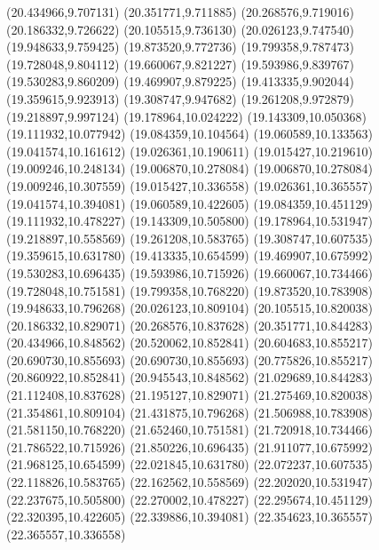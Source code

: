 {{\lineto(20.434966,9.707131)
\lineto(20.351771,9.711885)
\lineto(20.268576,9.719016)
\lineto(20.186332,9.726622)
\lineto(20.105515,9.736130)
\lineto(20.026123,9.747540)
\lineto(19.948633,9.759425)
\lineto(19.873520,9.772736)
\lineto(19.799358,9.787473)
\lineto(19.728048,9.804112)
\lineto(19.660067,9.821227)
\lineto(19.593986,9.839767)
\lineto(19.530283,9.860209)
\lineto(19.469907,9.879225)
\lineto(19.413335,9.902044)
\lineto(19.359615,9.923913)
\lineto(19.308747,9.947682)
\lineto(19.261208,9.972879)
\lineto(19.218897,9.997124)
\lineto(19.178964,10.024222)
\lineto(19.143309,10.050368)
\lineto(19.111932,10.077942)
\lineto(19.084359,10.104564)
\lineto(19.060589,10.133563)
\lineto(19.041574,10.161612)
\lineto(19.026361,10.190611)
\lineto(19.015427,10.219610)
\lineto(19.009246,10.248134)
\lineto(19.006870,10.278084)
\lineto(19.006870,10.278084)
\lineto(19.009246,10.307559)
\lineto(19.015427,10.336558)
\lineto(19.026361,10.365557)
\lineto(19.041574,10.394081)
\lineto(19.060589,10.422605)
\lineto(19.084359,10.451129)
\lineto(19.111932,10.478227)
\lineto(19.143309,10.505800)
\lineto(19.178964,10.531947)
\lineto(19.218897,10.558569)
\lineto(19.261208,10.583765)
\lineto(19.308747,10.607535)
\lineto(19.359615,10.631780)
\lineto(19.413335,10.654599)
\lineto(19.469907,10.675992)
\lineto(19.530283,10.696435)
\lineto(19.593986,10.715926)
\lineto(19.660067,10.734466)
\lineto(19.728048,10.751581)
\lineto(19.799358,10.768220)
\lineto(19.873520,10.783908)
\lineto(19.948633,10.796268)
\lineto(20.026123,10.809104)
\lineto(20.105515,10.820038)
\lineto(20.186332,10.829071)
\lineto(20.268576,10.837628)
\lineto(20.351771,10.844283)
\lineto(20.434966,10.848562)
\lineto(20.520062,10.852841)
\lineto(20.604683,10.855217)
\lineto(20.690730,10.855693)
\lineto(20.690730,10.855693)
\lineto(20.775826,10.855217)
\lineto(20.860922,10.852841)
\lineto(20.945543,10.848562)
\lineto(21.029689,10.844283)
\lineto(21.112408,10.837628)
\lineto(21.195127,10.829071)
\lineto(21.275469,10.820038)
\lineto(21.354861,10.809104)
\lineto(21.431875,10.796268)
\lineto(21.506988,10.783908)
\lineto(21.581150,10.768220)
\lineto(21.652460,10.751581)
\lineto(21.720918,10.734466)
\lineto(21.786522,10.715926)
\lineto(21.850226,10.696435)
\lineto(21.911077,10.675992)
\lineto(21.968125,10.654599)
\lineto(22.021845,10.631780)
\lineto(22.072237,10.607535)
\lineto(22.118826,10.583765)
\lineto(22.162562,10.558569)
\lineto(22.202020,10.531947)
\lineto(22.237675,10.505800)
\lineto(22.270002,10.478227)
\lineto(22.295674,10.451129)
\lineto(22.320395,10.422605)
\lineto(22.339886,10.394081)
\lineto(22.354623,10.365557)
\lineto(22.365557,10.336558)
}}
